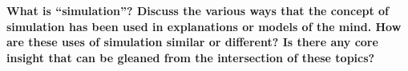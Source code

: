\documentclass{article}
\begin{document}
\textbf{What is ``simulation''? Discuss the various ways that the concept of simulation has been used in explanations or models of the mind. How are these uses of simulation similar or different? Is there any core insight that can be gleaned from the intersection of these topics?}
\end{document}
